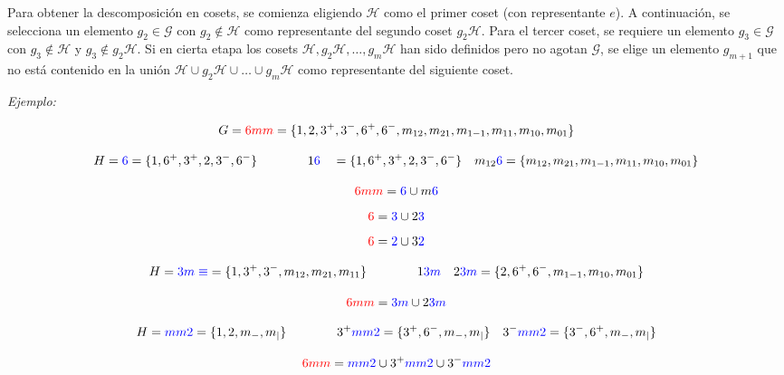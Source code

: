 \documentclass{report}
\begin{document}
\vspace{.2cm}




Para obtener la descomposición en cosets, se comienza eligiendo $\mathcal{H}$ como el primer coset (con representante $e$). A continuación, se selecciona un elemento $g_2 \in \mathcal{G}$ con $g_2 \notin \mathcal{H}$ como representante del segundo coset $g_2\mathcal{H}$. Para el tercer coset, se requiere un elemento $g_3 \in \mathcal{G}$ con $g_3 \notin \mathcal{H}$ y $g_3 \notin g_2\mathcal{H}$. Si en cierta etapa los cosets $\mathcal{H}, g_2\mathcal{H}, \dots, g_m\mathcal{H}$ han sido definidos pero no agotan $\mathcal{G}$, se elige un elemento $g_{m+1}$ que no está contenido en la unión $\mathcal{H} \cup g_2\mathcal{H} \cup \dots \cup g_m\mathcal{H}$ como representante del siguiente coset.\\
\vspace{.5cm}

\textit{Ejemplo:} 


\[G=\textcolor{red}{6mm}=
\{1, 2, 3^+, 3^-, 6^+, 6^-, m_{12}, m_{21}, m_{1-1}, m_{11}, m_{10}, m_{01} \}
\]
\hrulefill
\raggedright




\[ H=\textcolor{blue}{6}=
\{1, 6^+, 3^+, 2, 3^-, 6^-\} \qquad \qquad 1\textcolor{blue}{6} \quad =
\{1, 6^+, 3^+, 2, 3^-, 6^-\} 
\quad 
 m_{12}\textcolor{blue}{6}=\{m_{12}, m_{21}, m_{1-1}, m_{11}, m_{10}, m_{01} \}
\]


\[\textcolor{red}{6mm}=\textcolor{blue}{6}\cup m\textcolor{blue}{6}\]
\[\textcolor{red}{6}=\textcolor{blue}{3}\cup 2\textcolor{blue}{3}\]
\[\textcolor{red}{6}=\textcolor{blue}{2}\cup 3\textcolor{blue}{2}\]
\hrulefill
\vspace{.5cm}

\[H=\textcolor{blue}{
3m \equiv}=\{1, 3^+, 3^-, m_{12}, m_{21}, m_{11}\}
\qquad \qquad 1\textcolor{blue}{
3m} \quad 2\textcolor{blue}{
3m}=\{2,6^+,6^-,m_{1-1},m_{10},m_{01} \}
\]

\[\textcolor{red}{6mm}=\textcolor{blue}{3m}\cup 2\textcolor{blue}{3m}\]


\hrulefill
\vspace{.5cm}

\[H=\textcolor{blue}{
mm2}=\{1,2,m_{-},m_{|}\} 
\qquad \qquad 3^+\textcolor{blue}{
mm2}=\{3^+,6^-,m_{-},m_{|}\} 
\quad 
3^-\textcolor{blue}{
mm2}=\{3^-,6^+,m_{-},m_{|}\}  
  \]
  
  \[\textcolor{red}{6mm}=\textcolor{blue}{mm2}\cup 3^+\textcolor{blue}{mm2}\cup 3^-\textcolor{blue}{mm2}\]
\end{document}

